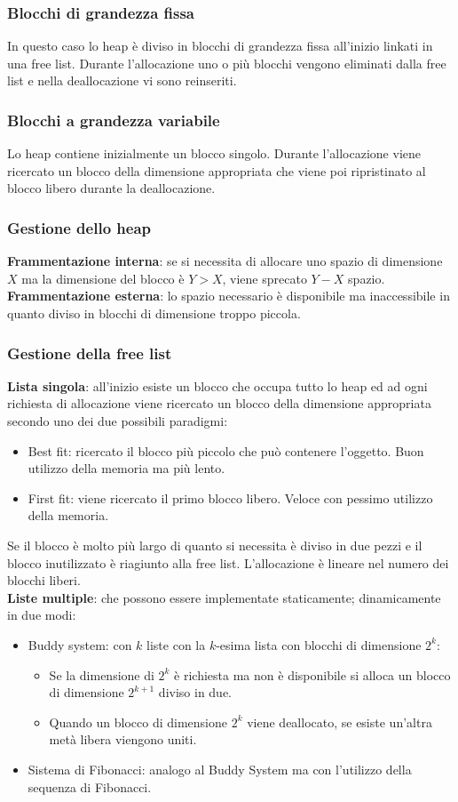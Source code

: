 \subsubsection{Blocchi di grandezza fissa}
In questo caso lo heap \`e diviso in blocchi di grandezza fissa all'inizio linkati in una free list. Durante l'allocazione uno o pi\`u blocchi vengono eliminati dalla free list
e nella deallocazione vi sono reinseriti. 
\subsubsection{Blocchi a grandezza variabile}
Lo heap contiene inizialmente un blocco singolo. Durante l'allocazione viene ricercato un blocco della dimensione appropriata che viene poi ripristinato al blocco libero 
durante la deallocazione. 
\subsubsection{Gestione dello heap}
\textbf{Frammentazione interna}: se si necessita di allocare uno spazio di dimensione $X$ ma la dimensione del blocco \`e $Y>X$, viene sprecato $Y-X$ spazio.\\
\textbf{Frammentazione esterna}: lo spazio necessario \`e disponibile ma inaccessibile in quanto diviso in blocchi di dimensione troppo piccola. 
\subsubsection{Gestione della free list}
\textbf{Lista singola}: all'inizio esiste un blocco che occupa tutto lo heap ed ad ogni richiesta di allocazione viene ricercato un blocco della dimensione appropriata secondo
uno dei due possibili paradigmi:
\begin{itemize}
\item Best fit: ricercato il blocco pi\`u piccolo che pu\`o contenere l'oggetto. Buon utilizzo della memoria ma pi\`u lento.
\item First fit: viene ricercato il primo blocco libero. Veloce con pessimo utilizzo della memoria.
\end{itemize}
Se il blocco \`e molto pi\`u largo di quanto si necessita \`e diviso in due pezzi e il blocco inutilizzato \`e riagiunto alla free list. L'allocazione \`e lineare nel numero
dei blocchi liberi. \\
\textbf{Liste multiple}: che possono essere implementate staticamente; dinamicamente in due modi:
\begin{itemize}
\item Buddy system: con $k$ liste con la $k$-esima lista con blocchi di dimensione $2^k$:
\begin{itemize}
\item Se la dimensione di $2^k$ \`e richiesta ma non \`e disponibile si alloca un blocco di dimensione $2^{k+1}$ diviso in due.
\item Quando un blocco di dimensione $2^k$ viene deallocato, se esiste un'altra met\`a libera viengono uniti. 
\end{itemize}
\item Sistema di Fibonacci: analogo al Buddy System ma con l'utilizzo della sequenza di Fibonacci. 
\end{itemize}

